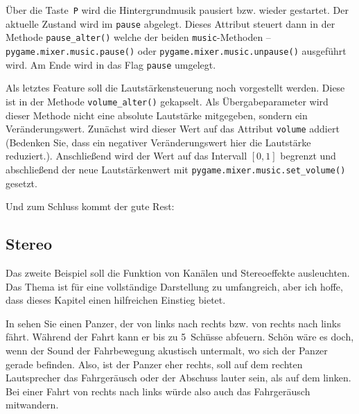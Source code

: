 Über die Taste~\texttt{P} wird die Hintergrundmusik pausiert bzw. wieder gestartet. Der aktuelle Zustand wird im \texttt{pause} abgelegt. Dieses Attribut steuert dann in der Methode \texttt{pause\_alter()} welche der beiden \texttt{music}-Methoden --  \texttt{pygame.mixer.music.pause()} oder \texttt{pygame.mixer.music.unpause()} ausgeführt wird. Am Ende wird in  das Flag \texttt{pause} umgelegt.


Als letztes Feature soll die Lautstärkensteuerung noch vorgestellt werden. Diese ist in der Methode \texttt{volume\_alter()} gekapselt. Als Übergabeparameter wird dieser Methode nicht eine absolute Lautstärke mitgegeben, sondern ein Veränderungswert. Zunächst wird dieser Wert auf das Attribut \texttt{volume} addiert (Bedenken Sie, dass ein negativer Veränderungswert hier die Lautstärke reduziert.). Anschließend wird der Wert auf das Intervall $[0, 1]$ begrenzt und abschließend der neue Lautstärkenwert mit \texttt{pygame.mixer.music\-.set\-\_volume()} gesetzt.


Und zum Schluss kommt der gute Rest:




\subsection{Stereo}

Das zweite Beispiel soll die Funktion von Kanälen und \Acrshort{Stereo}effekte ausleuchten. Das Thema ist für eine vollständige Darstellung zu umfangreich, aber ich hoffe, dass dieses Kapitel einen hilfreichen Einstieg bietet.

In  sehen Sie einen Panzer, der von links nach rechts bzw. von rechts nach links fährt.  Während der Fahrt kann er bis zu 5~Schüsse abfeuern. Schön wäre es doch, wenn der Sound der Fahrbewegung akustisch untermalt, wo sich der Panzer gerade befinden. Also, ist der Panzer eher rechts, soll auf dem rechten Lautsprecher das Fahrgeräusch oder der Abschuss lauter sein, als auf dem linken. Bei einer Fahrt von rechts nach links würde also auch das Fahrgeräusch mitwandern.


